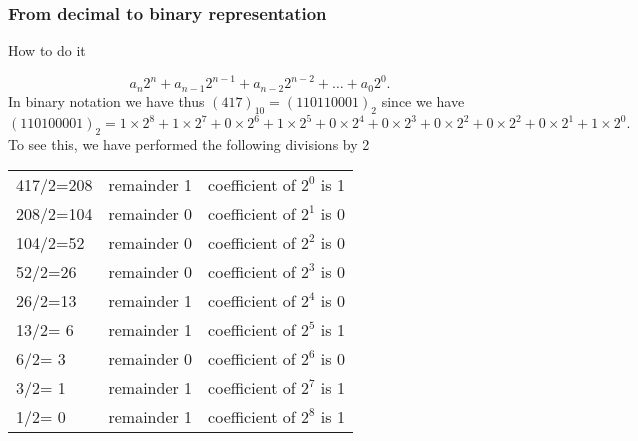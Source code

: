 \documentclass[compress]{beamer}
\begin{document}
\frame
{
  \frametitle{From decimal to binary representation}
  \begin{block}{How to do it}
\begin{small}
{\scriptsize
\[
  a_n2^n+a_{n-1}2^{n-1}  +a_{n-2}2^{n-2}  +\dots +a_{0}2^{0}.
\]
%
In binary notation we have thus $(417)_{10} =(110110001)_2$
since we have
\[
(110100001)_2
=1\times2^8+1\times 2^{7}+0\times 2^{6}+1\times 2^{5}+0\times 2^{4}+0\times 2^{3}+0\times 2^{2}+0\times 2^{2}+0\times 2^{1}+1\times 2^{0}.
\]
To see this, we have performed the following divisions by 2
\begin{center}
\begin{tabular}{lcc}\hline
417/2=208  & remainder 1& coefficient of $2^{0}$ is 1\\
208/2=104  & remainder 0& coefficient of $2^{1}$ is 0\\
104/2=52  & remainder 0& coefficient of $2^{2}$ is 0\\
52/2=26  & remainder 0& coefficient of $2^{3}$ is 0\\
26/2=13  & remainder 1& coefficient of $2^{4}$ is 0\\
13/2= 6 & remainder 1& coefficient of $2^{5}$ is 1\\
6/2= 3 & remainder 0& coefficient of $2^{6}$ is 0\\
3/2= 1 & remainder 1& coefficient of $2^{7}$ is 1\\
1/2= 0 & remainder 1& coefficient of $2^{8}$ is 1\\
\hline\end{tabular}%
\end{center}
}
\end{small}
  \end{block}
}

\end{document}
